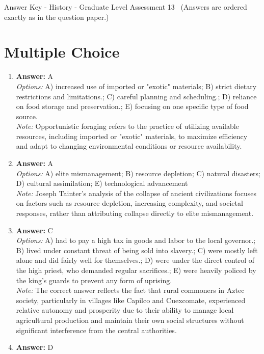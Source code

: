 \documentclass[12pt]{article}
\begin{document}
\begin{center}
Answer Key - History - Graduate Level Assessment 13 \
\small (Answers are ordered exactly as in the question paper.)
\end{center}

\section*{Multiple Choice}
\begin{enumerate}[label=\arabic*.]
\item \textbf{Answer:} A
\\ \textit{Options:} A) increased use of imported or "exotic" materials; B) strict dietary restrictions and limitations.; C) careful planning and scheduling.; D) reliance on food storage and preservation.; E) focusing on one specific type of food source.
\\ \textit{Note:} Opportunistic foraging refers to the practice of utilizing available resources, including imported or "exotic" materials, to maximize efficiency and adapt to changing environmental conditions or resource availability.
\item \textbf{Answer:} A
\\ \textit{Options:} A) elite mismanagement; B) resource depletion; C) natural disasters; D) cultural assimilation; E) technological advancement
\\ \textit{Note:} Joseph Tainter's analysis of the collapse of ancient civilizations focuses on factors such as resource depletion, increasing complexity, and societal responses, rather than attributing collapse directly to elite mismanagement.
\item \textbf{Answer:} C
\\ \textit{Options:} A) had to pay a high tax in goods and labor to the local governor.; B) lived under constant threat of being sold into slavery.; C) were mostly left alone and did fairly well for themselves.; D) were under the direct control of the high priest, who demanded regular sacrifices.; E) were heavily policed by the king's guards to prevent any form of uprising.
\\ \textit{Note:} The correct answer reflects the fact that rural commoners in Aztec society, particularly in villages like Capilco and Cuexcomate, experienced relative autonomy and prosperity due to their ability to manage local agricultural production and maintain their own social structures without significant interference from the central authorities.
\item \textbf{Answer:} D

\end{enumerate}
\end{document}
